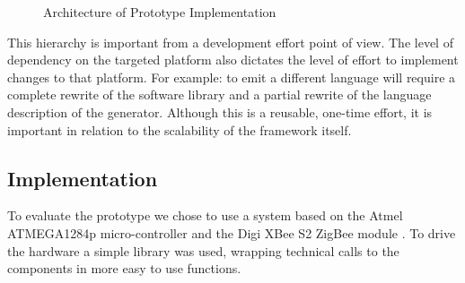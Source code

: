 \documentclass[conference]{IEEEtran}
\begin{document}
\begin{figure}[ht]
  \centering
  \caption{Architecture of Prototype Implementation}
  \label{fig:architecture}
\end{figure}

This hierarchy is important from a development effort point of view. The level
of dependency on the targeted platform also dictates the level of effort to
implement changes to that platform. For example: to emit a different language
will require a complete rewrite of the software library and a partial rewrite
of the language description of the generator. Although this is a reusable,
one-time effort, it is important in relation to the scalability of the
framework itself.

\subsection*{Implementation}

To evaluate the prototype we chose to use a system based on the Atmel
ATMEGA1284p micro-controller \cite{datasheet:atmega1284p} and the Digi XBee S2
ZigBee module \cite{manual:xbee}. To drive the hardware a simple library was
used, wrapping technical calls to the components in more easy to use functions.
\end{document}
